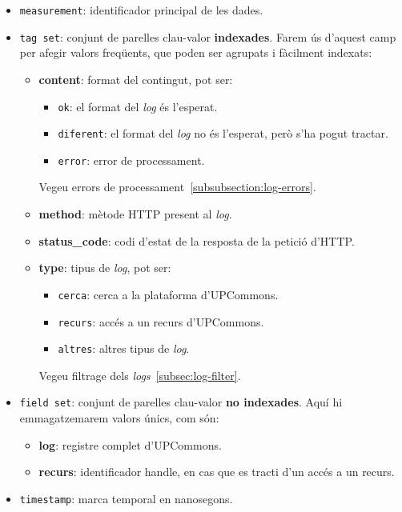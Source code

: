 \begin{itemize}
    \item \texttt{measurement}: identificador principal de les dades.
    \item \texttt{tag set}: conjunt de parelles clau-valor \textbf{indexades}.
    Farem ús d'aquest camp per afegir valors freqüents, que poden ser agrupats i fàcilment indexats:
    \begin{itemize}
        \item \textbf{content}: format del contingut, pot ser:
        \begin{itemize}
            \item \texttt{ok}: el format del \textit{\gls{log}} és l'esperat.
            \item \texttt{diferent}: el format del \textit{\gls{log}} no és l'esperat, però s'ha pogut tractar.
            \item \texttt{error}: error de processament.
        \end{itemize}
        Vegeu errors de processament~\ref{subsubsection:log-errors}.
        \item \textbf{method}: mètode \gls{HTTP} present al \textit{\gls{log}}.
        \item \textbf{status\_code}: codi d'estat de la resposta de la petició d'\gls{HTTP}.
        \item \textbf{type}: tipus de \textit{\gls{log}}, pot ser:
        \begin{itemize}
            \item \texttt{cerca}: cerca a la plataforma d'\gls{UPCommons}.
            \item \texttt{recurs}: accés a un recurs d'\gls{UPCommons}.
            \item \texttt{altres}: altres tipus de \textit{\gls{log}}.
        \end{itemize}
        Vegeu filtrage dels \textit{\gls{log}s}~\ref{subsec:log-filter}.
    \end{itemize}
    \item \texttt{field set}: conjunt de parelles clau-valor \textbf{no indexades}.
    Aquí hi emmagatzemarem valors únics, com són:
    \begin{itemize}
        \item \textbf{log}: registre complet d'\gls{UPCommons}.
        \item \textbf{recurs}: identificador \gls{handle}, en cas que es tracti d'un accés a un recurs.
    \end{itemize}
    \item \texttt{\gls{timestamp}}: marca temporal en nanosegons.
\end{itemize}

